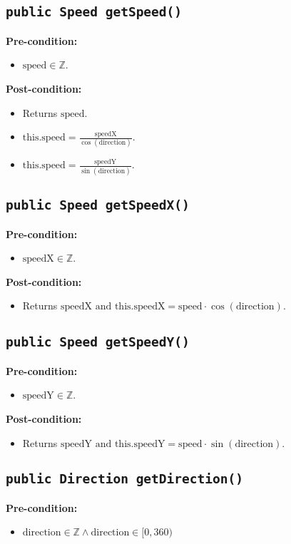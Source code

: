 \documentclass{article}
\begin{document}
\subsection*{\texttt{public Speed getSpeed()}}
\textbf{Pre-condition:}
\begin{itemize}
    \item \( \text{speed} \in \mathbb{Z} \).
\end{itemize}

\textbf{Post-condition:}
\begin{itemize}
    \item Returns \( \text{speed} \).
    \item \( \text{this.speed} = \frac{\text{speedX}}{\cos(\text{direction})} \).
    \item \( \text{this.speed} = \frac{\text{speedY}}{\sin(\text{direction})} \).
\end{itemize}


\subsection*{\texttt{public Speed getSpeedX()}}
\textbf{Pre-condition:}
\begin{itemize}
    \item \( \text{speedX} \in \mathbb{Z} \).
\end{itemize}

\textbf{Post-condition:}
\begin{itemize}
    \item Returns \( \text{speedX} \text{ and this.speedX} = \text{speed} \cdot \cos(\text{direction}) \).
\end{itemize}


\subsection*{\texttt{public Speed getSpeedY()}}
\textbf{Pre-condition:}
\begin{itemize}
    \item \( \text{speedY} \in \mathbb{Z} \).
\end{itemize}

\textbf{Post-condition:}
\begin{itemize}
    \item Returns \( \text{speedY} \text{ and this.speedY} = \text{speed} \cdot \sin(\text{direction}) \).
\end{itemize}


\subsection*{\texttt{public Direction getDirection()}}
\textbf{Pre-condition:}
\begin{itemize}
     \item \( \text{direction} \in \mathbb{Z} \wedge \text{direction} \in [0,360) \)
\end{itemize}
\end{document}
